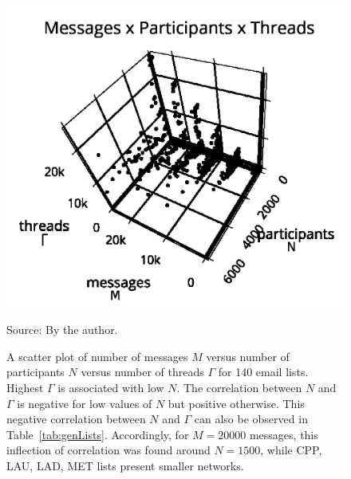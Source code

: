 \begin{figure}
\centering
\includegraphics[trim={0 0 0 1cm},clip,width=.7\columnwidth]{figs/mpgamma2_}
\caption{A scatter plot of number of messages $M$ versus number of participants $N$ versus number of threads $\Gamma$ for 140 email lists.
Highest $\Gamma$ is associated with low $N$.
The correlation between $N$ and $\Gamma$ is negative for low values of $N$ but positive otherwise.
This negative correlation between $N$ and $\Gamma$ can also be observed in Table~\ref{tab:genLists}.
Accordingly, for $M=20000$ messages, this inflection
of correlation was found around $N=1500$, while CPP, LAU, LAD, MET lists 
present smaller networks.}
\begin{flushleft}\footnotesize
Source: By the author.\
\end{flushleft}
\label{fig:nmgamma3d}
\end{figure}



